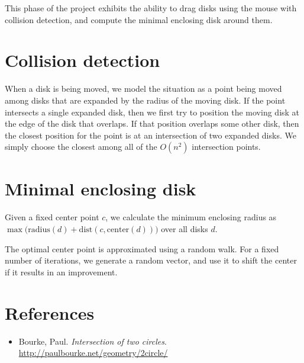 \documentclass[10pt,twocolumn]{article}
\begin{document}
This phase of the project exhibits the ability to drag disks
using the mouse with collision detection, and compute the
minimal enclosing disk around them.

\section{Collision detection}

When a disk is being moved, we model the situation as a point
being moved among disks that are expanded by the radius of the
moving disk.
If the point intersects a single expanded disk, then we first
try to position the moving disk at the edge of the disk that
overlaps.
If that position overlaps some other disk, then the closest
position for the point is at an intersection of two expanded disks.
We simply choose the closest among all of the $O(n^2)$ intersection points.

\section{Minimal enclosing disk}

Given a fixed center point $c$, we calculate the minimum enclosing radius
as $\max \Big( \textrm{radius}(d) + \textrm{dist}(c, \textrm{center}(d)) \Big)$
over all disks $d$.

The optimal center point is approximated using a random walk.
For a fixed number of iterations, we generate a random vector,
and use it to shift the center if it results in an improvement.

\section{References}

\begin{itemize}

\item Bourke, Paul. \textit{Intersection of two circles}.
\url{http://paulbourke.net/geometry/2circle/}

\end{itemize}
\end{document}
